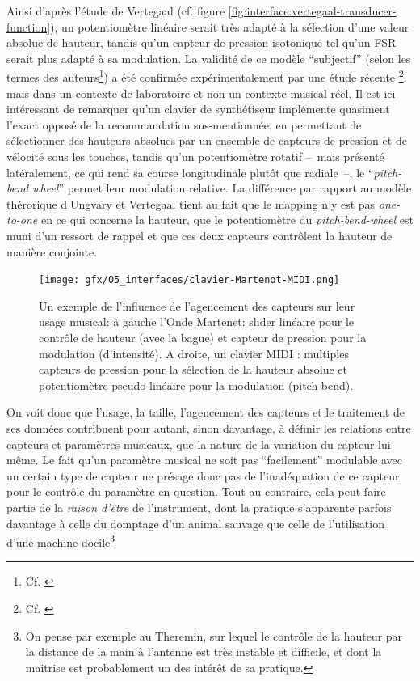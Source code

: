 \indent Ainsi d'après l'étude de Vertegaal (cf. figure \ref{fig:interface:vertegaal-transducer-function}), un potentiomètre linéaire serait très adapté à la sélection d'une valeur absolue de hauteur, tandis qu'un capteur de pression isotonique tel qu'un \gls{FSR} serait plus adapté à sa modulation. La validité de ce modèle ``subjectif'' (selon les termes des auteurs\footnote{Cf. \cite{ungvary_cognition_1999}}) a été confirmée expérimentalement par une étude récente \footnote{Cf. \cite{malloch_design_2019}}, mais dans un contexte de laboratoire et non un contexte musical réel. Il est ici intéressant de remarquer qu'un clavier de synthétiseur implémente quasiment l'exact opposé de la recommandation sus-mentionnée, en permettant de sélectionner des hauteurs absolues par un ensemble de capteurs de pression et de vélocité sous les touches, tandis qu'un potentiomètre rotatif --~mais présenté latéralement, ce qui rend sa course longitudinale plutôt que radiale~--, le ``\textit{pitch-bend wheel}'' permet leur modulation relative. La différence par rapport au modèle thérorique d'Ungvary et Vertegaal tient au fait que le mapping n'y est pas \textit{one-to-one} en ce qui concerne la hauteur, que le potentiomètre du \textit{pitch-bend-wheel} est muni d'un ressort de rappel et que ces deux capteurs contrôlent la hauteur de manière conjointe.\\
\begin{figure}[!htbp]
	\captionsetup{format=plain}%
	\texttt{[image: gfx/05\_interfaces/clavier-Martenot-MIDI.png]}
	\caption[Agencement des capteurs et fonction musicale]{Un exemple de l'influence de l'agencement des capteurs sur leur usage musical: à gauche l'Onde Martenet: slider linéaire pour le contrôle de hauteur (avec la bague) et capteur de pression pour la modulation (d'intensité). A droite, un clavier MIDI : multiples capteurs de pression pour la sélection de la hauteur absolue et potentiomètre pseudo-linéaire pour la modulation (pitch-bend).}
	\label{fig:interface:martenot-clavier}
\end{figure}
\indent On voit donc que l'usage, la taille, l'agencement des capteurs et le traitement de ses données contribuent pour autant, sinon davantage, à définir les relations entre capteurs et paramètres musicaux, que la nature de la variation du capteur lui-même. Le fait qu'un paramètre musical ne soit pas ``facilement'' modulable avec un certain type de capteur ne présage donc pas de l'inadéquation de ce capteur pour le contrôle du paramètre en question. Tout au contraire, cela peut faire partie de la \textit{raison d'être} de l'instrument, dont la pratique s'apparente parfois davantage à celle du domptage d'un animal sauvage que celle de l'utilisation d'une machine docile\footnote{On pense par exemple au Theremin, sur lequel le contrôle de la hauteur par la distance de la main à l'antenne est très instable et difficile, et dont la maitrise est probablement un des intérêt de sa pratique.}

